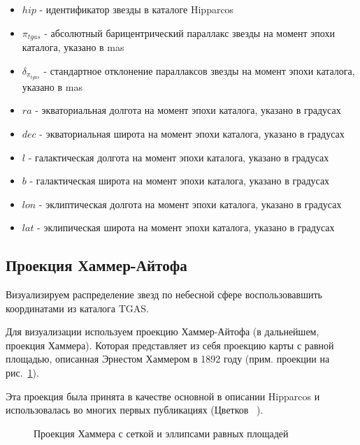 \documentclass[14pt]{article} %
\begin{document}
\begin{itemize}

\item $hip$ - идентификатор звезды в каталоге Hipparcos

\item $\pi_{tgas}$ - абсолютный барицентрический параллакс звезды на момент эпохи каталога, указано в mas

\item $\delta_{\pi_{tgas}}$ - стандартное отклонение параллаксов звезды на момент эпохи каталога, указано в mas

\item $ra$ - экваториальная долгота на момент эпохи каталога, указано в градусах

\item $dec$ - экваториальная широта на момент эпохи каталога, указано в градусах

\item $l$ - галактическая долгота на момент эпохи каталога, указано в градусах

\item $b$ - галактическая широта на момент эпохи каталога, указано в градусах

\item $lon$ - эклиптическая долгота на момент эпохи каталога, указано в градусах

\item $lat$ - эклипическая широта на момент эпохи каталога, указано в градусах

\end{itemize}

\subsection{Проекция Хаммер-Айтофа}\label{sub:hammer}

Визуализируем распределение звезд по небесной сфере воспользовавшить координатами из каталога TGAS. 

Для визуализации используем проекцию Хаммер-Айтофа (в дальнейшем, проекция Хаммера). Которая представляет из себя проекцию карты с равной площадью, описанная Эрнестом Хаммером в 1892 году (прим. проекции на рис.~\ref{img:hammtiss}).

Эта проекция была принята в качестве основной в описании Hipparcos и использовалась во многих первых публикациях (Цветков ~\cite{book:hipparcos}).

\begin{figure}[h!]
\caption{Проекция Хаммера с сеткой и эллипсами равных площадей}
\label{img:hammtiss}
\end{figure}
\end{document}
